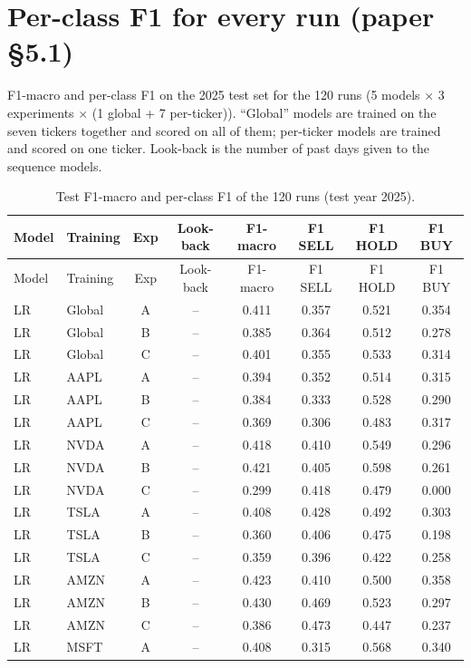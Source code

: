 \documentclass[10pt]{article}
\begin{document}
\section{Per-class F1 for every run (paper \S5.1)}
F1-macro and per-class F1 on the 2025 test set for the 120 runs (5 models $\times$
3 experiments $\times$ (1 global + 7 per-ticker)). ``Global'' models are trained on the seven
tickers together and scored on all of them; per-ticker models are trained and scored on one
ticker. Look-back is the number of past days given to the sequence models.

{\small\begin{longtable}{@{}l l c c c c c c@{}}
\caption{Test F1-macro and per-class F1 of the 120 runs (test year 2025).}\label{tab:s2}\\
\toprule Model & Training & Exp & Look-back & F1-macro & F1 SELL & F1 HOLD & F1 BUY \\ \midrule \endfirsthead
\toprule Model & Training & Exp & Look-back & F1-macro & F1 SELL & F1 HOLD & F1 BUY \\ \midrule \endhead
\bottomrule \endlastfoot
LR & Global & A & -- & 0.411 & 0.357 & 0.521 & 0.354 \\
LR & Global & B & -- & 0.385 & 0.364 & 0.512 & 0.278 \\
LR & Global & C & -- & 0.401 & 0.355 & 0.533 & 0.314 \\
LR & AAPL & A & -- & 0.394 & 0.352 & 0.514 & 0.315 \\
LR & AAPL & B & -- & 0.384 & 0.333 & 0.528 & 0.290 \\
LR & AAPL & C & -- & 0.369 & 0.306 & 0.483 & 0.317 \\
LR & NVDA & A & -- & 0.418 & 0.410 & 0.549 & 0.296 \\
LR & NVDA & B & -- & 0.421 & 0.405 & 0.598 & 0.261 \\
LR & NVDA & C & -- & 0.299 & 0.418 & 0.479 & 0.000 \\
LR & TSLA & A & -- & 0.408 & 0.428 & 0.492 & 0.303 \\
LR & TSLA & B & -- & 0.360 & 0.406 & 0.475 & 0.198 \\
LR & TSLA & C & -- & 0.359 & 0.396 & 0.422 & 0.258 \\
LR & AMZN & A & -- & 0.423 & 0.410 & 0.500 & 0.358 \\
LR & AMZN & B & -- & 0.430 & 0.469 & 0.523 & 0.297 \\
LR & AMZN & C & -- & 0.386 & 0.473 & 0.447 & 0.237 \\
LR & MSFT & A & -- & 0.408 & 0.315 & 0.568 & 0.340 \\

\end{longtable}}
\end{document}
